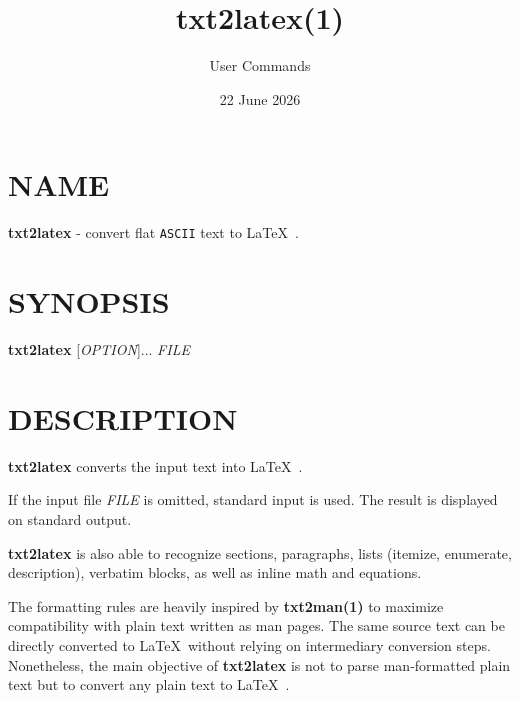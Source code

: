 \documentclass[10pt,notitlepage]{article}
\title{txt2latex(1)}
\author{User Commands}
\date{22 June 2026}
\begin{document}
\maketitle

\section*{NAME}
\textbf{txt2latex} - convert flat \texttt{ASCII} text to \LaTeX\  .

\section*{SYNOPSIS}
{\ttfamily
\textbf{txt2latex} [\textit{OPTION}]... \textit{FILE} 

}
\section*{DESCRIPTION}
\textbf{txt2latex} converts the input text into \LaTeX\  . 

If the input file \textit{FILE} is omitted, standard input is used. 
The result is displayed on standard output. 

\textbf{txt2latex} is also able to recognize sections, paragraphs,
lists (itemize, enumerate, description), verbatim blocks, as well as
inline math and equations.
  
The formatting rules are heavily inspired by \textbf{txt2man(1)} to maximize
compatibility with plain text written as man pages. 
The same source text can be directly converted to 
\LaTeX\   without relying on intermediary conversion steps.
Nonetheless, the main objective of \textbf{txt2latex} is not to parse man-formatted
plain text but to convert any plain text to \LaTeX\  . 
\end{document}
